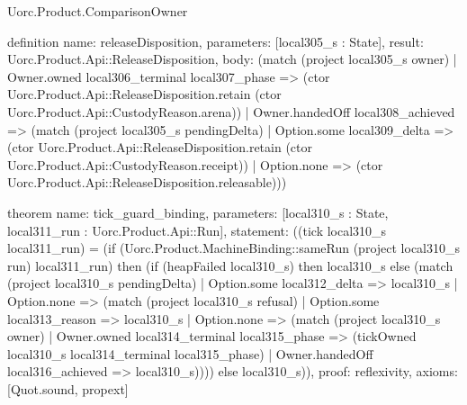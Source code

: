 \begin{lexlean}{Uorc.Product.ComparisonOwner}
\begin{semanticmodule}
definition{
  name: releaseDisposition,
  parameters: [local305_s : State],
  result: Uorc.Product.Api::ReleaseDisposition,
  body: (match (project local305_s owner)
    | Owner.owned local306_terminal local307_phase => (ctor Uorc.Product.Api::ReleaseDisposition.retain (ctor Uorc.Product.Api::CustodyReason.arena))
    | Owner.handedOff local308_achieved => (match (project local305_s pendingDelta)
      | Option.some local309_delta => (ctor Uorc.Product.Api::ReleaseDisposition.retain (ctor Uorc.Product.Api::CustodyReason.receipt))
      | Option.none => (ctor Uorc.Product.Api::ReleaseDisposition.releasable)))
}

theorem{
  name: tick_guard_binding,
  parameters: [local310_s : State, local311_run : Uorc.Product.Api::Run],
  statement: ((tick local310_s local311_run) = (if (Uorc.Product.MachineBinding::sameRun (project local310_s run) local311_run) then (if (heapFailed local310_s) then local310_s else (match (project local310_s pendingDelta)
    | Option.some local312_delta => local310_s
    | Option.none => (match (project local310_s refusal)
      | Option.some local313_reason => local310_s
      | Option.none => (match (project local310_s owner)
        | Owner.owned local314_terminal local315_phase => (tickOwned local310_s local314_terminal local315_phase)
        | Owner.handedOff local316_achieved => local310_s)))) else local310_s)),
  proof: reflexivity{},
  axioms: [Quot.sound, propext]
}


\end{semanticmodule}
\end{lexlean}
